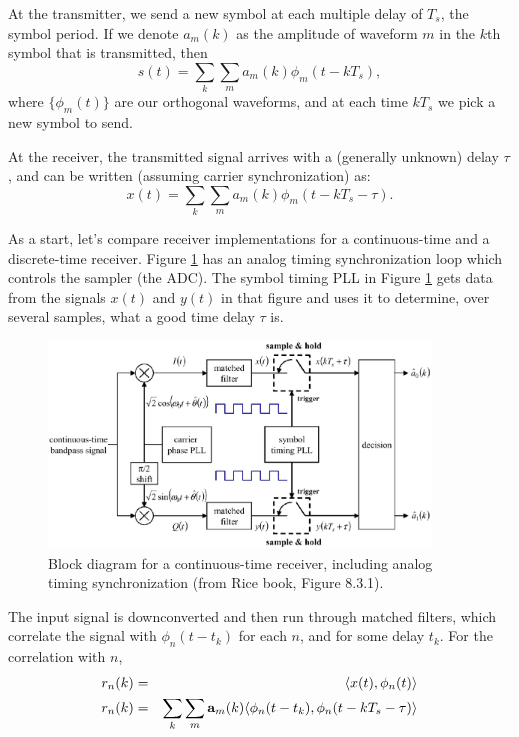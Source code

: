 At the transmitter, we send a new symbol at each multiple delay of $T_s$, the symbol period.  If we denote $a_m(k)$ as the amplitude of waveform $m$ in the $k$th symbol that is transmitted, then
\begin{equation} \label{E:TxSignalNoDelay}
  s(t) = \sum_k \sum_m a_m(k) \phi_m(t - kT_{s}),
\end{equation}
where $\{\phi_m(t)\}$ are our orthogonal waveforms, and at each time $kT_s$ we pick a new symbol to send.

At the receiver, the transmitted signal arrives with a (generally unknown) delay $\tau$, and can be written (assuming carrier synchronization) as:
\begin{equation} \label{E:RxSignalDelay}
  x(t) = \sum_k \sum_m a_m(k) \phi_m(t - kT_{s} - \tau).
\end{equation}

As a start, let's compare receiver implementations for a continuous-time and a discrete-time receiver.  Figure
\ref{F:AnalogReceiver} has an analog timing synchronization loop which controls the sampler (the ADC).  The symbol timing PLL in Figure \ref{F:AnalogReceiver} gets data from the signals $x(t)$ and $y(t)$ in that figure and uses it to determine, over several samples, what a good time delay $\tau$ is.

\begin{figure}[htbp]
  \centerline{\includegraphics[width=4in]{../images/M_Rice_Figure8_9.eps}}
  \caption{Block diagram for a continuous-time receiver, including analog timing synchronization
  (from Rice book, Figure 8.3.1).}
  \label{F:AnalogReceiver}
\end{figure}

The input signal is downconverted and then run through matched
filters, which correlate the signal with $\phi_n(t - t_k)$ for each
$n$, and for some delay $t_k$. For the correlation with $n$,
\begin{eqnarray} \label{E:MF_output_delay}
  r_n(k) &=& \langle x(t), \phi_n(t) \rangle \nonumber \\ 
  r_n(k) &=& \sum_k \sum_m \mathbf{a}_m(k) \langle \phi_n(t-t_k), \phi_n(t - kT_{s} -  \tau) \rangle
\end{eqnarray}


